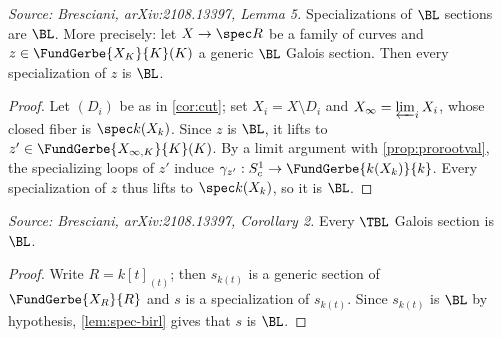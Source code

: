 \begin{lemma}[SpecBirat]
  \label{lem:spec-birl}
  \textit{Source: Bresciani, arXiv:2108.13397, Lemma 5.}
  Specializations of \(\BL\) sections are \(\BL\). More precisely: let
  \(X \to \spec R\) be a family of curves and \(z \in \FundGerbe{X_K}{K}(K)\) a
  generic \(\BL\) Galois section. Then every specialization of \(z\) is \(\BL\).
\end{lemma}

\begin{proof}
  Let \((D_i)\) be as in \cref{cor:cut}; set \(X_i = X \setminus D_i\) and
  \(X_\infty = \varprojlim_i X_i\), whose closed fiber is \(\spec k(X_k)\).
  Since \(z\) is \(\BL\), it lifts to \(z' \in \FundGerbe{X_{\infty,K}}{K}(K)\).
  By a limit argument with \cref{prop:prorootval}, the specializing loops of \(z'\)
  induce \(\gamma_{z'} : S^1_c \to \FundGerbe{k(X_k)}{k}\). Every specialization of
  \(z\) thus lifts to \(\spec k(X_k)\), so it is \(\BL\).
\end{proof}

\begin{corollary}[TBiratBirat]
  \label{cor:tbirl-birl}
  \textit{Source: Bresciani, arXiv:2108.13397, Corollary 2.}
  Every \(\TBL\) Galois section is \(\BL\).
\end{corollary}

\begin{proof}
  Write \(R = k[t]_{(t)}\); then \(s_{k(t)}\) is a generic section of
  \(\FundGerbe{X_R}{R}\) and \(s\) is a specialization of \(s_{k(t)}\). Since
  \(s_{k(t)}\) is \(\BL\) by hypothesis, \cref{lem:spec-birl} gives that \(s\) is
  \(\BL\).
\end{proof}


